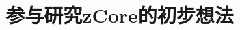\documentclass[
11pt, %
]{beamer}
\title{参与研究zCore的初步想法}
\institute[Massclouds]{乾云科技}
\begin{document}
	\begin{frame}
		\titlepage
	\end{frame}
\end{document}
